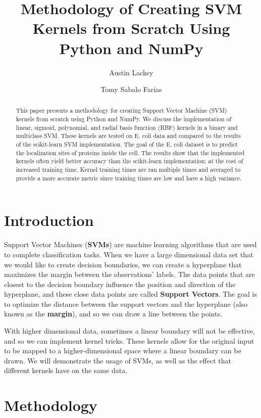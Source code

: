 \documentclass[12pt]{article}
\title{Methodology of Creating SVM Kernels from Scratch Using Python and NumPy}
\author{Austin Lackey}
\author{Tomy Sabalo Farias}
\affil{DSCI 320, Colorado State University}
\begin{document}
\maketitle

\begin{abstract}
This paper presents a methodology for creating Support Vector Machine (SVM) kernels from scratch using Python and NumPy. 
We discuss the implementation of linear, sigmoid, polynomial, and radial basis function (RBF) kernels in a binary and multiclass SVM.
These kernels are tested on E. coli data and compared to the results of the scikit-learn SVM implementation.
The goal of the E. coli dataset is to predict the localization sites of proteins inside the cell. 
The results show that the implemented kernels often yield better accuracy than the scikit-learn implementation; at the
cost of increased training time. Kernel training times are ran multiple times and averaged to provide a more accurate
metric since training times are low and have a high variance.
\end{abstract}

\section{Introduction}

Support Vector Machines (\textbf{SVMs}) are machine learning algorithms that are used to complete classification tasks. When we have a large dimensional data set that we would like to create decision boundaries, we can create a hyperplane that maximizes the margin between the observations' labels. The data points that are closest to the decision boundary influence the position and direction of the hyperplane, and these close data points are called \textbf{Support Vectors}. The goal is to optimize the distance between the support vectors and the hyperplane (also known as the \textbf{margin}), and so we can draw a line between the points.

With higher dimensional data, sometimes a linear boundary will not be effective, and so we can implement kernel tricks. These kernels allow for the original input to be mapped to a higher-dimensional space where a linear boundary can be drawn. We will demonstrate the usage of SVMs, as well as the effect that different kernels have on the same data. 

\section{Methodology}
\end{document}
